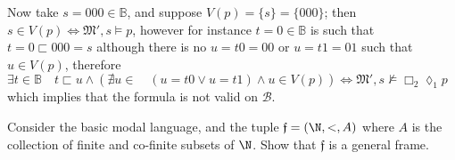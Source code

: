 \documentclass[a4paper, 12pt]{report}
\begin{document}
{\begin{enumerate}[label=(\alph*)]
\begin{itemize}
                        Now take $s = 000 \in \mathbb B$, and suppose $V(p) = \{s\} = \{000\}$; then $s \in V(p) \iff \mathfrak M', s \models p$, however for instance $t = 0 \in \mathbb B$ is such that $t = 0 \sqsubset 000 = s$ although there is no $u = t0 = 00$ or $u = t1 = 01$ such that $u \in V(p)$, therefore $\exists t \in \mathbb B \quad t \sqsubset u \land (\nexists u \in \mathbb \quad (u = t0 \lor u = t1) \land u \in V(p)) \iff \mathfrak M', s \not\models \Box_2 \lozenge_1 p$ which implies that the formula is not valid on $\mathcal B$.
                \end{itemize}
        \end{enumerate}
    }

     Consider the basic modal language, and the tuple $\mathfrak f = (\N, <, A)$ where $A$ is the collection of finite and co-finite subsets of $\N$. Show that $\mathfrak f$ is a general frame.
\end{document}
